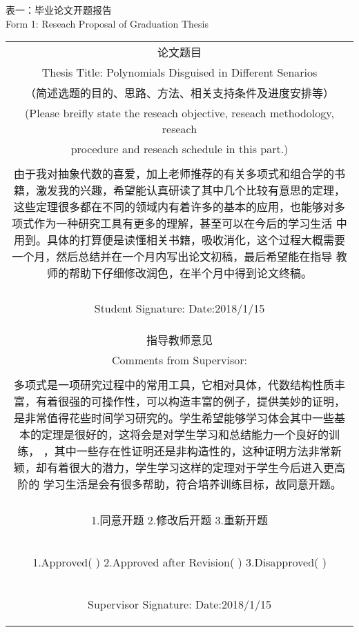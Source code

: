 \begin{center}
表一：毕业论文开题报告\\
Form 1: Reseach Proposal of Graduation Thesis
\end{center}

\begin{tabular}{|c|}%
\hline  %
论文题目 \\
Thesis Title: Polynomials Disguised in Different Senarios \\
\hline  %
\noindent
（简述选题的目的、思路、方法、相关支持条件及进度安排等）\\
(Please breifly state the reseach objective, reseach methodology, reseach \\
procedure and reseach schedule in this part.) 
\\
\\
由于我对抽象代数的喜爱，加上老师推荐的有关多项式和组合学的书籍，激发我的兴趣，希望能认真研读了其中几个比较有意思的定理，
这些定理很多都在不同的领域内有着许多的基本的应用，也能够对多项式作为一种研究工具有更多的理解，甚至可以在今后的学习生活
中用到。具体的打算便是读懂相关书籍，吸收消化，这个过程大概需要一个月，然后总结并在一个月内写出论文初稿，最后希望能在指导
教师的帮助下仔细修改润色，在半个月中得到论文终稿。
\\
\\
\noindent
\begin{center}
Student Signature:                                Date:2018/1/15
\end{center}
\\
\hline %
指导教师意见 \\
Comments from Supervisor:
\\
\\
多项式是一项研究过程中的常用工具，它相对具体，代数结构性质丰富，有着很强的可操作性，可以构造丰富的例子，提供美妙的证明，
是非常值得花些时间学习研究的。学生希望能够学习体会其中一些基本的定理是很好的，这将会是对学生学习和总结能力一个良好的训练，
，其中一些存在性证明还是非构造性的，这种证明方法非常新颖，却有着很大的潜力，学生学习这样的定理对于学生今后进入更高阶的
学习生活是会有很多帮助，符合培养训练目标，故同意开题。
\noindent
\\
\\
\begin{center}
1.同意开题                   2.修改后开题                       3.重新开题
\end{center}
\\
\begin{center}
1.Approved( )                   2.Approved after Revision( )                       3.Disapproved( )
\end{center}
\\
\noindent
\begin{center}
Supervisor Signature:                                Date:2018/1/15
\end{center}
\\
\end{tabular}